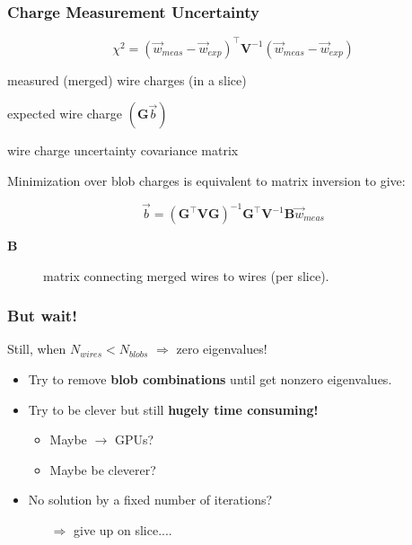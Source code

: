 \begin{frame}
  \frametitle{Charge Measurement Uncertainty}

  \[\chi^2 = (\vec{w}_{meas}-\vec{w}_{exp})^\intercal\mathbf{V}^{-1} (\vec{w}_{meas}-\vec{w}_{exp})\]

  \vspace{3mm}

  \begin{description}\footnotesize
  \item[$\vec{w}_{meas}$] measured (merged) wire charges (in a slice)
  \item[$\vec{w}_{exp}$] expected wire charge $(\mathbf{G}\vec{b})$
  \item[$\mathbf{V}$] wire charge uncertainty covariance matrix
  \end{description}

  \vspace{3mm}

  \footnotesize{Minimization over blob charges is equivalent to matrix inversion to
  give:}

  \[\vec{b} = (\mathbf{G}^\intercal\mathbf{V}\mathbf{G})^{-1}\mathbf{G}^\intercal\mathbf{V}^{-1}\mathbf{B}\vec{w}_{meas} \]

  \footnotesize
  \begin{description}
  \item[$\mathbf{B}$] matrix connecting merged wires to wires (per slice).
  \end{description}

\end{frame}

\begin{frame}
  \frametitle{But wait!}

  Still, when $N_{wires} < N_{blobs}$ $\Rightarrow$ zero eigenvalues!
  \begin{itemize}
  \item   Try to remove \textbf{blob combinations} until get nonzero eigenvalues.
  \item   Try to be clever but still \textbf{hugely time consuming!}  
    \begin{itemize}
    \item Maybe $\rightarrow$ GPUs?
    \item Maybe be cleverer?
    \end{itemize}
  \item  No solution by a fixed number of iterations?
    \begin{itemize}
    \item[$\Rightarrow$] give up on slice....
    \end{itemize}
  \end{itemize}
\end{frame}


